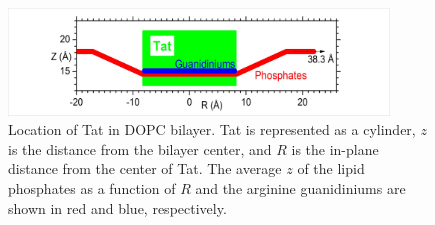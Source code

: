 \begin{figure}[htbp]
  \centering
  \includegraphics[width=0.9\textwidth]{figures/Tat/figure9}
  \caption{Location of Tat in DOPC bilayer. Tat is represented as a cylinder, $z$ is the distance
  from the bilayer center, and $R$ is the in-plane distance from the center of Tat. The average $z$ of
  the lipid phosphates as a function of $R$ and the arginine guanidiniums are shown in red and blue,
  respectively.}
  \label{fig:figure9}
\end{figure}


